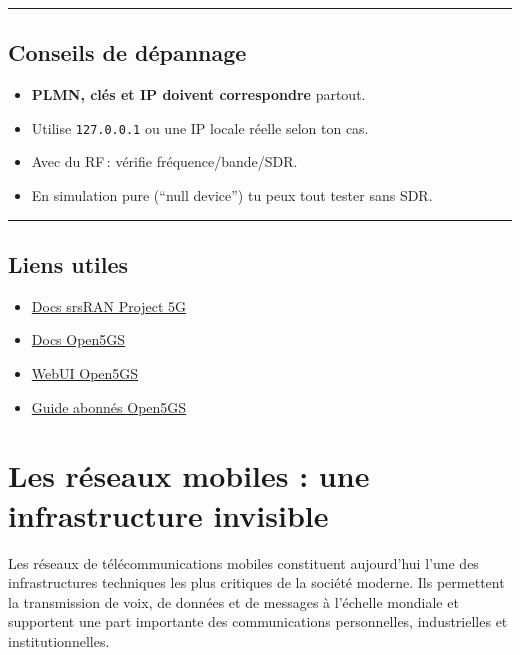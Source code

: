 \documentclass[
  french,
]{article}
\providecommand{\tightlist}{%
  \setlength{\itemsep}{0pt}\setlength{\parskip}{0pt}}
\begin{document}
\begin{center}\rule{0.5\linewidth}{0.5pt}\end{center}

\subsection{Conseils de dépannage}\label{conseils-de-duxe9pannage}

\begin{itemize}
\tightlist
\item
  \textbf{PLMN, clés et IP doivent correspondre} partout.
\item
  Utilise \texttt{127.0.0.1} ou une IP locale réelle selon ton cas.
\item
  Avec du RF\,: vérifie fréquence/bande/SDR.
\item
  En simulation pure (``null device'') tu peux tout tester sans SDR.
\end{itemize}

\begin{center}\rule{0.5\linewidth}{0.5pt}\end{center}

\subsection{Liens utiles}\label{liens-utiles-2}

\begin{itemize}
\tightlist
\item
  \href{https://docs.srsran.com/projects/5g/en/latest/}{Docs srsRAN
  Project 5G}
\item
  \href{https://open5gs.org/open5gs/docs/}{Docs Open5GS}
\item
  \href{https://github.com/open5gs/open5gs/wiki/WebUI}{WebUI Open5GS}
\item
  \href{https://open5gs.org/open5gs/docs/guide-subscription/}{Guide
  abonnés Open5GS}
\end{itemize}

\section{Les réseaux mobiles : une infrastructure
invisible}\label{les-ruxe9seaux-mobiles-une-infrastructure-invisible}

Les réseaux de télécommunications mobiles constituent aujourd'hui l'une
des infrastructures techniques les plus critiques de la société moderne.
Ils permettent la transmission de voix, de données et de messages à
l'échelle mondiale et supportent une part importante des communications
personnelles, industrielles et institutionnelles.
\end{document}
